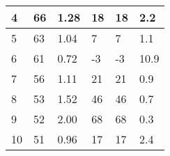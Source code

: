 \begin{table}[H]
\begin{tabular}{|l|l|l|l|l|l|}
\hline
4                   & 66                                                             & 1.28                                                             & 18        & 18                                                                          & 2.2                                                                             \\ 
\hline
5                   & 63                                                             & 1.04                                                             & 7         & 7                                                                           & 1.1                                                                             \\ 
\hline
6                   & 61                                                             & 0.72                                                             & -3        & -3                                                                          & 10.9                                                                            \\ 
\hline
7                   & 56                                                             & 1.11                                                             & 21        & 21                                                                          & 0.9                                                                             \\ 
\hline
8                   & 53                                                             & 1.52                                                             & 46        & 46                                                                          & 0.7                                                                             \\ 
\hline
9                   & 52                                                             & 2.00                                                             & 68        & 68                                                                          & 0.3                                                                             \\ 
\hline
10                  & 51                                                             & 0.96                                                             & 17        & 17                                                                          & 2.4                                                                             \\ 

\end{tabular}
\end{table}
